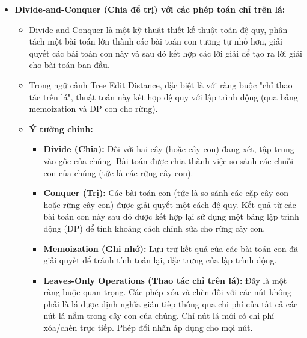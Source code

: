 \documentclass{article}
\begin{document}
\begin{itemize}
    \item \textbf{Divide-and-Conquer (Chia để trị) với các phép toán chỉ trên lá:}
    \begin{itemize}
        \item Divide-and-Conquer là một kỹ thuật thiết kế thuật toán đệ quy, phân tách một bài toán lớn thành các bài toán con tương tự nhỏ hơn, giải quyết các bài toán con này và sau đó kết hợp các lời giải để tạo ra lời giải cho bài toán ban đầu.
        \item Trong ngữ cảnh Tree Edit Distance, đặc biệt là với ràng buộc "chỉ thao tác trên lá", thuật toán này kết hợp đệ quy với lập trình động (qua bảng memoization và DP con cho rừng).
        \item \textbf{Ý tưởng chính:}
            \begin{itemize}
                \item \textbf{Divide (Chia):} Đối với hai cây (hoặc cây con) đang xét, tập trung vào gốc của chúng. Bài toán được chia thành việc so sánh các chuỗi con của chúng (tức là các rừng cây con).
                \item \textbf{Conquer (Trị):} Các bài toán con (tức là so sánh các cặp cây con hoặc rừng cây con) được giải quyết một cách đệ quy. Kết quả từ các bài toán con này sau đó được kết hợp lại sử dụng một bảng lập trình động (DP) để tính khoảng cách chỉnh sửa cho rừng cây con.
                \item \textbf{Memoization (Ghi nhớ):} Lưu trữ kết quả của các bài toán con đã giải quyết để tránh tính toán lại, đặc trưng của lập trình động.
                \item \textbf{Leaves-Only Operations (Thao tác chỉ trên lá):} Đây là một ràng buộc quan trọng. Các phép xóa và chèn đối với các nút không phải là lá được định nghĩa gián tiếp thông qua chi phí của tất cả các nút lá nằm trong cây con của chúng. Chỉ nút lá mới có chi phí xóa/chèn trực tiếp. Phép đổi nhãn áp dụng cho mọi nút.
            \end{itemize}
    \end{itemize}


\end{itemize}
\end{document}
